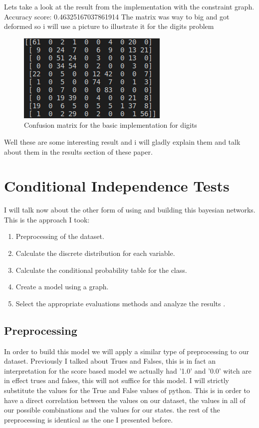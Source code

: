 \documentclass{article} %
\begin{document}
\bigskip
Lets take a look at the result from the implementation with the constraint graph.
\bigskip
Accuracy score: 0.46325167037861914
The matrix was way to big and got deformed so i will use a picture to illustrate it for the digits problem
\begin{figure}[h!]
  \includegraphics[scale = 1]{CFCG.png}
  \centering
  \caption{Confusion matrix for the basic implementation for digits}\hspace*{\fill}
  \label{fig:Confusion matrix for the constraint implementation for digits}
\end{figure}
\bigskip
Well these are some interesting result and i will gladly explain them and talk about them in the results section of these paper.
\section{Conditional Independence Tests}
I will talk now about the other form of using and building this bayesian networks. This is the approach I took:
\begin{enumerate} 
 \item Preprocessing of the dataset.
 
 \item Calculate the discrete distribution for each variable.
 
 \item Calculate the conditional probability table for the class.
 \item  Create a model using a graph.  
 
  \item  Select the appropriate evaluations methods and analyze the results . 
\end{enumerate} 
\subsection{Preprocessing}
In order to build this model we will apply a similar type of preprocessing to our dataset. Previously I talked about Trues and Falses, this is in fact an interpretation for the score based model we actually had '1.0' and '0.0' witch are in effect trues and falses, this will not suffice for this model. I will strictly substitute the values for the True and False values of python. This is in order to have a direct correlation between the values on our dataset, the values in all of our possible combinations and the values for our states. the rest of the preprocessing is identical as the one I presented before.
\end{document}
